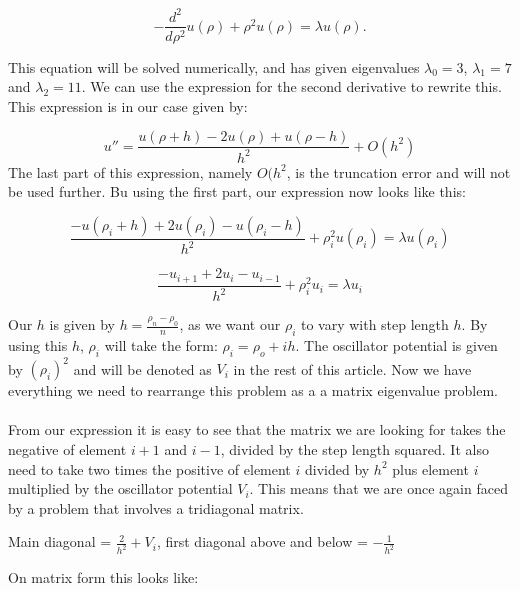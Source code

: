 \documentclass[10pt,a4paper]{article}
\begin{document}
$$
  -\frac{d^2}{d\rho^2} u(\rho) + \rho^2u(\rho)  = \lambda u(\rho) .
$$

\noindent This equation will be solved numerically, and has given eigenvalues $\lambda_0=3$, $\lambda_1=7$ and $\lambda_2=11$. We can use the expression for the second derivative to rewrite this. This expression is in our case given by:

$$
 u''=\frac{u(\rho+h) -2u(\rho) +u(\rho-h)}{h^2} +O(h^2)
$$
\noindent
The last part of this expression, namely $O(h^2$, is the truncation error and will not be used further. Bu using the first part, our expression now looks like this:

$$
\frac{-u(\rho_i+h) +2u(\rho_i) -u(\rho_i-h)}{h^2}+\rho_i^2u(\rho_i)  = \lambda u(\rho_i)
$$

$$
\frac{-u_{i+1} +2u_i -u_{i-1}}{h^2}+\rho_i^2u_i= \lambda u_i
$$

\noindent Our $h$ is given by $h=\frac{\rho_n - \rho_0}{n}$, as we want our $\rho_i$ to vary with step length $h$. By using this $h$, $\rho_i$ will take the form: $\rho_i = \rho_o + ih$. The oscillator potential is given by $(\rho_i)^2$ and will be denoted as $V_i$ in the rest of this article. Now we have everything we need to rearrange this problem as a a matrix eigenvalue problem. \\
\\
From our expression it is easy to see that the matrix we are looking for takes the negative of element $i+1$ and $i-1$, divided by the step length squared. It also need to take two times the positive of element $i$ divided by $h^2$ plus element $i$ multiplied by the oscillator potential $V_i$. This means that we are once again faced by a problem that involves a tridiagonal matrix.

\begin{center}
Main diagonal = $\frac{2}{h^2} + V_i$, first diagonal above and below = $-\frac{1}{h^2}$
\end{center}

\noindent On matrix form this looks like:
\end{document}
